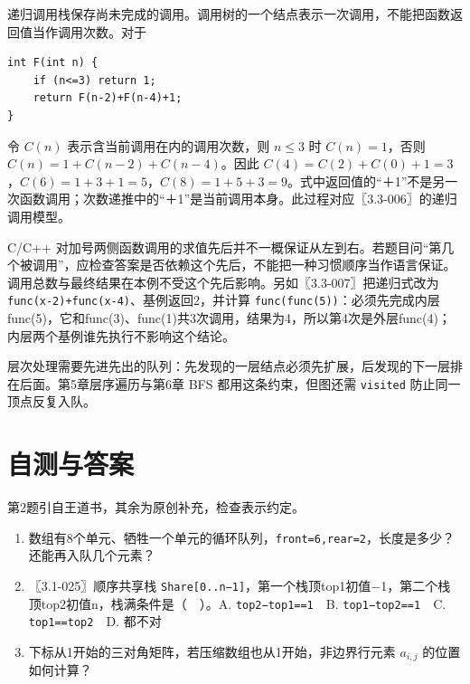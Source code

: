递归调用栈保存尚未完成的调用。调用树的一个结点表示一次调用，不能把函数返回值当作调用次数。对于

\par\medskip\noindent
\begin{minipage}{\linewidth}
\begin{verbatim}
int F(int n) {
    if (n<=3) return 1;
    return F(n-2)+F(n-4)+1;
}
\end{verbatim}
\end{minipage}\par\medskip

令 \(C(n)\) 表示含当前调用在内的调用次数，则 \(n\le3\) 时 \(C(n)=1\)，否则 \(C(n)=1+C(n-2)+C(n-4)\)。因此 \(C(4)=C(2)+C(0)+1=3\)，\(C(6)=1+3+1=5\)，\(C(8)=1+5+3=9\)。式中返回值的``＋1''不是另一次函数调用；次数递推中的``＋1''是当前调用本身。此过程对应〖3.3-006〗的递归调用模型。

C/C++ 对加号两侧函数调用的求值先后并不一概保证从左到右。若题目问``第几个被调用''，应检查答案是否依赖这个先后，不能把一种习惯顺序当作语言保证。调用总数与最终结果在本例不受这个先后影响。另如〖3.3-007〗把递归式改为 \allowbreak{}\texttt{func(x-2)+func(x-4)}、基例返回2，并计算 \allowbreak{}\texttt{func(func(5))}：必须先完成内层func(5)，它和func(3)、func(1)共3次调用，结果为4，所以第4次是外层func(4)；内层两个基例谁先执行不影响这个结论。

层次处理需要先进先出的队列：先发现的一层结点必须先扩展，后发现的下一层排在后面。第5章层序遍历与第6章 BFS 都用这条约束，但图还需 \allowbreak{}\texttt{visited} 防止同一顶点反复入队。

\section{自测与答案}\label{ds-ch3-check}

第2题引自王道书，其余为原创补充，检查表示约定。

\begin{enumerate}
\def\labelenumi{\arabic{enumi}.}
\tightlist
\item
  数组有8个单元、牺牲一个单元的循环队列，\allowbreak{}\texttt{front=6,}\allowbreak{}\texttt{rear=2}，长度是多少？还能再入队几个元素？
\item
  〖3.1-025〗顺序共享栈 \allowbreak{}\texttt{Share{[}0..n−1{]}}，第一个栈顶top1初值−1，第二个栈顶top2初值n，栈满条件是（　）。A. \allowbreak{}\texttt{top2−top1==1}　B. \allowbreak{}\texttt{top1−top2==1}　C. \allowbreak{}\texttt{top1==top2}　D. 都不对
\item
  下标从1开始的三对角矩阵，若压缩数组也从1开始，非边界行元素 \(a_{i,j}\) 的位置如何计算？
\end{enumerate}


